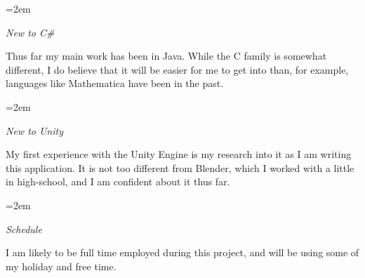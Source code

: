 \documentclass[paper=a4,fontsize=11pt]{scrartcl} %
\newlength{\spacebox}
\newcommand{\sepspace}{\vspace*{1em}}		%
\newcommand{\PersonalEntry}[2]{
		\noindent\hangindent=2em\hangafter=0 %
		\parbox{\spacebox}{        %
		\textit{#1}}		       %
		\hspace{1.5em} #2 \par}    %
\newcommand{\SkillsEntry}[2]{      %
		\noindent\hangindent=2em\hangafter=0 %
		\parbox{\spacebox}{        %
		\textit{#1}}			   %
		\hspace{1.5em} \parbox{6\spacebox}{#2} \par}    %
\begin{document}
\SkillsEntry{New to C\#}{Thus far my main work has been in Java. While the C family is somewhat different, I do believe that it will be easier for me to get into than, for example, languages like Mathematica have been in the past.}
\sepspace

\SkillsEntry{New to Unity}{My first experience with the Unity Engine is my research into it as I am writing this application. It is not too different from Blender, which I worked with a little in high-school, and I am confident about it thus far.}
\sepspace

\SkillsEntry{Schedule}{I am likely to be full time employed during this project, and will be using some of my holiday and free time.}


\end{document}
